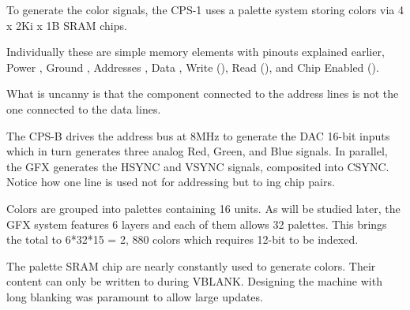 To generate the color signals, the CPS-1 uses a palette system storing colors via 4 x 2Ki x 1B  SRAM chips.


Individually these are simple memory elements with pinouts explained earlier, Power , Ground , Addresses , Data , Write (), Read (), and Chip Enabled ().

What is uncanny is that the component connected to the address lines is not the one connected to the data lines.







The CPS-B drives the address bus at 8MHz to generate the DAC 16-bit inputs which in turn generates three analog Red, Green, and Blue signals. In parallel, the GFX generates the HSYNC and VSYNC signals, composited into CSYNC.
Notice how one line is used not for addressing but to ing chip pairs. 


Colors are grouped into palettes containing 16 units. As will be studied later, the GFX system features 6 layers and each of them allows 32 palettes. This brings the total to 6*32*15 = 2, 880 colors which requires 12-bit to be indexed.


 The palette SRAM chip are nearly constantly used to generate colors. Their content can only be written to during VBLANK. Designing the machine with long blanking was paramount to allow large updates. 



 




\pagebreak




